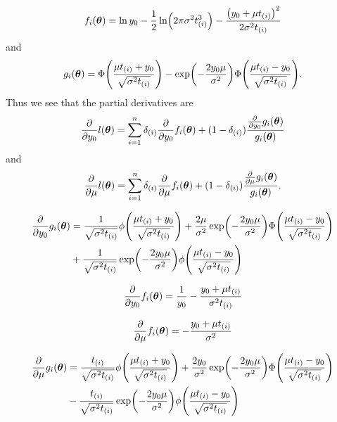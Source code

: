 \begin{equation}
f_i(\btheta)=\ln y_0-\frac{1}{2}\ln\p*{2\pi\sigma^2\ti^3}-\frac{\p*{y_0+\mu\ti}^2}{2\sigma^2\ti}
\end{equation}
and
\begin{equation}
g_i(\btheta)=\Phi\p*{\frac{\mu\ti+y_0}{\sqrt{\sigma^2\ti}}}-\exp\p*{-\frac{2y_0\mu}{\sigma^2}}\Phi\p*{\frac{\mu\ti-y_0}{\sqrt{\sigma^2\ti}}}.
\end{equation}
Thus we see that the partial derivatives are
\begin{equation}
    \frac{\partial}{\partial y_0}l(\boldsymbol{\theta})=\sum_{i=1}^n\delta_{(i)} \frac{\partial}{\partial y_0}f_i(\boldsymbol{\theta})+(1-\delta_{(i)})\frac{\frac{\partial}{\partial y_0}g_i(\boldsymbol{\theta})}{g_i(\boldsymbol{\theta})}
\end{equation}
and
\begin{equation}
    \frac{\partial}{\partial \mu}l(\boldsymbol{\theta})=\sum_{i=1}^n\delta_{(i)} \frac{\partial}{\partial \mu}f_i(\boldsymbol{\theta})+(1-\delta_{(i)})\frac{\frac{\partial}{\partial \mu}g_i(\boldsymbol{\theta})}{g_i(\boldsymbol{\theta})}.
\end{equation}

\begin{align}
\begin{split}
    \frac{\partial}{\partial y_0}g_i(\btheta)&=\frac{1}{\sqrt{\sigma^2\ti}}\phi\p*{\frac{\mu\ti+y_0}{\sqrt{\sigma^2\ti}}}+\frac{2\mu}{\sigma^2}\exp\p*{-\frac{2y_0\mu}{\sigma^2}}\Phi\p*{\frac{\mu\ti-y_0}{\sqrt{\sigma^2\ti}}} \\
    &+
    \frac{1}{\sqrt{\sigma^2\ti}}\exp\p*{-\frac{2y_0\mu}{\sigma^2}}\phi\p*{\frac{\mu\ti-y_0}{\sqrt{\sigma^2\ti}}}
\end{split}
\end{align}


\begin{equation}
    \frac{\partial}{\partial y_0}f_i(\boldsymbol{\theta})=\frac{1}{y_0}-\frac{y_0+\mu t_{(i)}}{\sigma^2t_{(i)}}
\end{equation}

\begin{equation}
    \frac{\partial}{\partial \mu}f_i(\boldsymbol{\theta})=-\frac{y_0+\mu t_{(i)}}{\sigma^2}
\end{equation}

\begin{align}
\begin{split}
    \frac{\partial}{\partial \mu}g_i(\btheta)&=\frac{\ti}{\sqrt{\sigma^2\ti}}\phi\p*{\frac{\mu\ti+y_0}{\sqrt{\sigma^2\ti}}}+\frac{2y_0}{\sigma^2}\exp\p*{-\frac{2y_0\mu}{\sigma^2}}\Phi\p*{\frac{\mu\ti-y_0}{\sqrt{\sigma^2\ti}}} \\
    &-
    \frac{\ti}{\sqrt{\sigma^2\ti}}\exp\p*{-\frac{2y_0\mu}{\sigma^2}}\phi\p*{\frac{\mu\ti-y_0}{\sqrt{\sigma^2\ti}}}
\end{split}
\end{align}
